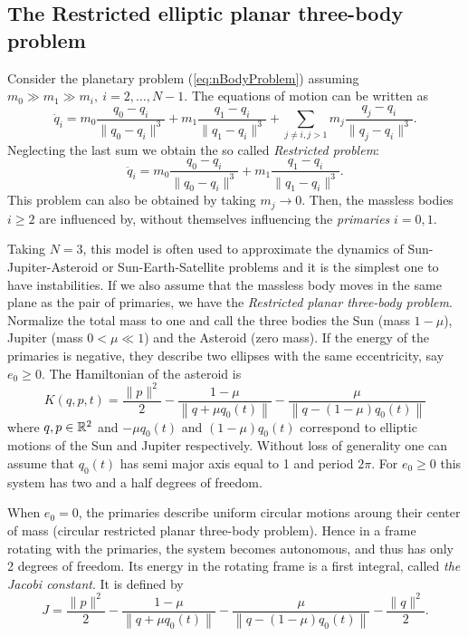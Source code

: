 \subsection{The Restricted elliptic planar three-body problem}

Consider  the planetary problem (\ref{eq:nBodyProblem})
assuming $m_0\gg m_1\gg m_i,\ i=2,\dots,N-1$. The equations of 
motion can be written as
\begin{equation}\label{eq:3BodyProblem}
  \ddot q_i = m_0 \frac{q_0 - q_i}{\|q_0-q_i\|^3}+
  m_1 \frac{q_1 - q_i}{\|q_1-q_i\|^3}+\sum_{j \neq i, j>1} 
  m_j \frac{q_j - q_i}{\|q_j-q_i\|^3}.
\end{equation}
Neglecting the last sum we obtain the so called {\it Restricted problem}:
\begin{equation}\label{eq:R3BodyProblem}
  \ddot q_i = m_0 \frac{q_0 - q_i}{\|q_0-q_i\|^3}+
  m_1 \frac{q_1 - q_i}{\|q_1-q_i\|^3}.
\end{equation}
This problem can also be obtained by taking $m_j\to 0$. Then, the massless bodies  $i\geq 2$ are influenced by,
without themselves influencing the \emph{primaries} $i=0,1$.

Taking $N=3$,  this model is often used to approximate the dynamics of Sun-Jupiter-Asteroid or
Sun-Earth-Satellite problems and it is the simplest one to have instabilities. If we also assume that  the massless body moves in the same plane as the pair of primaries,  we have the 
{\it  Restricted planar three-body problem}.
Normalize the total mass to one and call the three bodies the Sun
(mass $1-\mu$), Jupiter (mass $0<\mu \ll 1$) and the
Asteroid (zero mass). If the energy of the primaries is negative, they
describe two ellipses with the same eccentricity, say $e_0\geq0$. The
Hamiltonian of the asteroid is
\begin{equation}\label{def:Ham:Cartesian}
  K(q,p,t)= \frac{\|p\|^2}{2} - \frac{1-\mu}{\left\|q+\mu
      q_0(t)\right\|}-\frac{\mu}{\left\|q-(1-\mu)q_0(t)\right\|}
\end{equation}
where $q,p\in\mathbb{R}^2$ and $-\mu q_0(t)$ and $(1-\mu)q_0(t)$ correspond
to elliptic motions of the Sun and Jupiter respectively. Without loss
of generality one can assume that $q_0(t)$ has semi major axis equal
to 1 and period $2\pi$. For $e_0\geq 0$ this system has two and a half
degrees of freedom.

When $e_0=0$, the primaries describe uniform circular motions aroung
their center of mass (circular restricted planar three-body problem).
Hence in a frame rotating with the primaries, the system becomes
autonomous, and thus has only 2 degrees of freedom. Its energy in the
rotating frame is a first integral, called {\it the Jacobi constant}.
It is defined by
\begin{equation}\label{def:Jacobi}
  J= \frac{\|p\|^2}{2}- \frac{1-\mu}{\left\|q+\mu
      q_0(t)\right\|} -
  \frac{\mu}{\left\|q-(1-\mu)q_0(t)\right\|}-\frac{\|q\|^2}{2}.
\end{equation}

